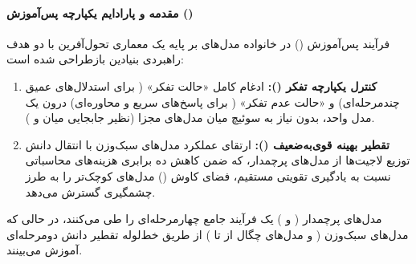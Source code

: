 \item {}

\paragraph*{مقدمه و پارادایم یکپارچه پس‌آموزش ()}
فرآیند پس‌آموزش () در خانواده مدل‌های  \cite{qwen3techreport} بر پایه یک معماری تحول‌آفرین با دو هدف راهبردی بنیادین بازطراحی شده است:
\begin{enumerate}
    \item \textbf{کنترل یکپارچه تفکر ():} ادغام کامل «حالت تفکر» ( برای استدلال‌های عمیق چندمرحله‌ای) و «حالت عدم تفکر» ( برای پاسخ‌های سریع و محاوره‌ای) درون یک مدل واحد، بدون نیاز به سوئیچ میان مدل‌های مجزا (نظیر جابجایی میان  و  \cite{qwq32b}).
    \item \textbf{تقطیر بهینه قوی‌به‌ضعیف ():} ارتقای عملکرد مدل‌های سبک‌وزن با انتقال دانش توزیع لاجیت‌ها از مدل‌های پرچمدار، که ضمن کاهش ده برابری هزینه‌های محاسباتی نسبت به یادگیری تقویتی مستقیم، فضای کاوش () مدل‌های کوچک‌تر را به طرز چشمگیری گسترش می‌دهد.
\end{enumerate}

مدل‌های پرچمدار ( و ) یک فرآیند جامع چهارمرحله‌ای را طی می‌کنند، در حالی که مدل‌های سبک‌وزن ( و مدل‌های چگال از  تا ) از طریق خط‌لوله تقطیر دانش دومرحله‌ای آموزش می‌بینند.

